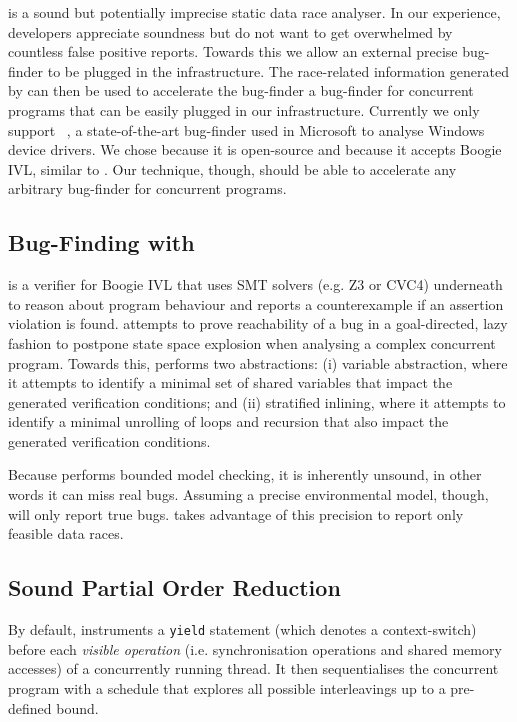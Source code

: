 \whoop is a sound but potentially imprecise static data race analyser. In our experience, developers appreciate soundness but do not want to get overwhelmed by countless false positive reports. Towards this we allow an external precise bug-finder to be plugged in the \whoop infrastructure. The race-related information generated by \whoop can then be used to accelerate the bug-finder a bug-finder for concurrent programs that can be easily plugged in our infrastructure. Currently we only support \corral~\cite{lal2012corral}, a state-of-the-art bug-finder used in Microsoft to analyse Windows device drivers. We chose \corral because it is open-source and because it accepts Boogie IVL, similar to \whoop. Our technique, though, should be able to accelerate any arbitrary bug-finder for concurrent programs.

\subsection{Bug-Finding with \corral}
\label{bf:corral}

\corral is a verifier for Boogie IVL that uses SMT solvers (e.g. Z3 or CVC4) underneath to reason about program behaviour and reports a counterexample if an assertion violation is found. \corral attempts to prove reachability of a bug in a goal-directed, lazy fashion to postpone state space explosion when analysing a complex concurrent program. Towards this, \corral performs two abstractions: (i) variable abstraction, where it attempts to identify a minimal set of shared variables that impact the generated verification conditions; and (ii) stratified inlining, where it attempts to identify a minimal unrolling of loops and recursion that also impact the generated verification conditions.

Because \corral performs bounded model checking, it is inherently unsound, in other words it can miss real bugs. Assuming a precise environmental model, though, \corral will only report true bugs. \whoop takes advantage of this precision to report only feasible data races.

\subsection{Sound Partial Order Reduction}
\label{bf:reduction}

By default, \corral instruments a \texttt{yield} statement (which denotes a context-switch) before each \emph{visible operation} (i.e. synchronisation operations and shared memory accesses) of a concurrently running thread. It then sequentialises the concurrent program with a schedule that explores all possible interleavings up to a pre-defined bound.

